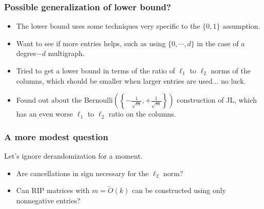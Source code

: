 \documentclass[aspectratio=34]{beamer}
\theoremstyle{plain}
\begin{document}
\begin{frame}
\frametitle{Possible generalization of lower bound?}
\begin{itemize}
\item The lower bound uses some techniques very specific to the $\{0,1\}$ assumption.
\item Want to see if more entries helps, such as using $\{0,\cdots,d\}$ in the case of a degree$-d$ multigraph. 
\item Tried to get a lower bound in terms of the ratio of $\ell_1$ to $\ell_2$ norms of the columns, which should be smaller when larger entries are used... no luck. 
\item Found out about the Bernoulli$\left(\left\{-\frac{1}{\sqrt{m}},+\frac{1}{\sqrt{m}}\right\}\right)$ construction of JL, which has an even worse $\ell_1$ to $\ell_2$ ratio on the columns.
\end{itemize}
\end{frame}
%
\begin{frame}
\frametitle{A more modest question}
Let's ignore derandomization for a moment.
\begin{itemize}
\item Are cancellations in sign necessary for the $\ell_2$ norm?

\item Can RIP matrices with $m = \tilde{O}(k)$ can be constructed using only nonnegative entries?
\end{itemize}
 
\end{frame}
\end{document}
